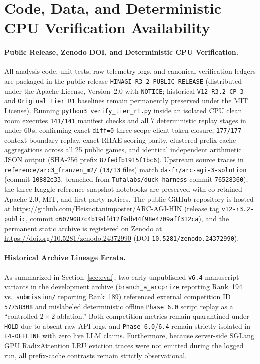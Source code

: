 \documentclass[10pt]{article}
\newcommand{\code}[1]{\texttt{#1}}
\begin{document}
\appendix
\section{Code, Data, and Deterministic CPU Verification Availability}
\label{app:repro}

\paragraph{Public Release, Zenodo DOI, and Deterministic CPU Verification.}
All analysis code, unit tests, raw telemetry logs, and canonical verification ledgers are packaged in the public release \code{HINAGI\_R3\_2\_PUBLIC\_RELEASE} (distributed under the Apache License, Version~2.0 with \code{NOTICE}; historical \code{V12 R3.2-CP-3} and \code{Original Tier R1} baselines remain permanently preserved under the MIT License). Running \code{python3 verify\_tier\_r1.py} inside an isolated CPU clean room executes \code{141/141} manifest checks and all 7 deterministic replay stages in under 60\,s, confirming exact \code{diff=0} three-scope client token closure, \code{177/177} context-boundary replay, exact RHAE scoring parity, clustered prefix-cache aggregations across all 25 public games, and identical independent arithmetic JSON output (SHA-256 prefix \code{87fedfb1915f1bc6}). Upstream source traces in \code{reference/arc3\_franzen\_m2/} (\code{13/13} files) match \code{da-fr/arc-agi-3-solution} (commit \code{10882e33}, branched from \code{Tufalabs/duck-harness} commit \code{76528360}); the three Kaggle reference snapshot notebooks are preserved with co-retained Apache-2.0, MIT, and first-party notices. The public GitHub repository is hosted at \url{https://github.com/Heisnotanimposter/ARC-AGI-HIN} (release tag \code{v12-r3.2-public}, commit \code{d6079087c4b19dfd12f9db44f98e4709aff312ca}), and the permanent static archive is registered on Zenodo at \url{https://doi.org/10.5281/zenodo.24372990} (DOI \code{10.5281/zenodo.24372990}).

\paragraph{Historical Archive Lineage Errata.}
As summarized in Section~\ref{sec:eval}, two early unpublished \code{v6.4} manuscript variants in the development archive (\code{branch\_a\_arcprize} reporting Rank~194 vs.\ \code{submission/} reporting Rank~189) referenced external competition ID \code{57758308} and mislabeled deterministic offline \code{Phase~6.0} script replay as a ``controlled $2\times 2$ ablation.'' Both competition metrics remain quarantined under \code{HOLD} due to absent raw API logs, and \code{Phase~6.0}/\code{6.4} remain strictly isolated in \code{E4-OFFLINE} with zero live LLM claims. Furthermore, because server-side SGLang GPU RadixAttention LRU eviction traces were not emitted during the logged run, all prefix-cache contrasts remain strictly observational.
\end{document}
